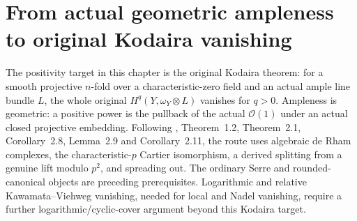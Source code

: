 \section{From actual geometric ampleness to original Kodaira vanishing}

The positivity target in this chapter is the original Kodaira theorem:
for a smooth projective $n$-fold over a characteristic-zero field and an
actual ample line bundle $L$, the whole original
$H^q(Y,\omega_Y\otimes L)$ vanishes for $q>0$. Ampleness is geometric:
a positive power is the pullback of the actual $\mathcal O(1)$ under an
actual closed projective embedding. Following \cite{DI87}, Theorem~1.2, Theorem~2.1, Corollary~2.8,
Lemma~2.9 and Corollary~2.11, the route uses algebraic de Rham
complexes, the characteristic-$p$ Cartier isomorphism, a derived splitting
from a genuine lift modulo $p^2$, and spreading out. The ordinary Serre
and rounded-canonical objects are preceding prerequisites. Logarithmic
and relative Kawamata--Viehweg vanishing, needed for local and Nadel
vanishing, require a further logarithmic/cyclic-cover argument beyond
this Kodaira target.

